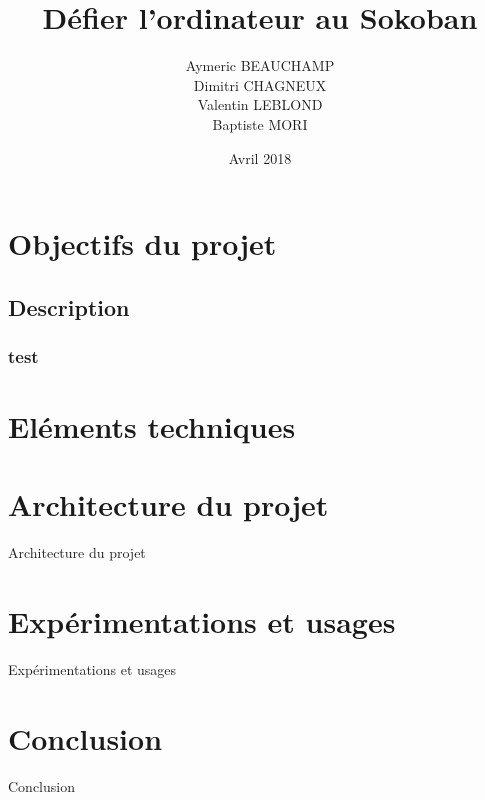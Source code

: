 \documentclass{beamer}
\title{Défier l'ordinateur au Sokoban}
\author{Aymeric BEAUCHAMP\\Dimitri CHAGNEUX\\Valentin LEBLOND\\Baptiste MORI}
\date{Avril 2018}
\begin{document}
 
\maketitle 

\frame{\tableofcontents}

\section{Objectifs du projet}
\subsection{Description}
\begin{frame} %
\frametitle{test}
\end{frame}

\section{Eléments techniques}

\begin{frame}

\end{frame}

\begin{frame}

\end{frame}

\section{Architecture du projet}
\begin{frame}
Architecture du projet
\end{frame}
\section{Expérimentations et usages}
\begin{frame}
Expérimentations et usages
\end{frame}
\section{Conclusion}
\begin{frame}
Conclusion
\end{frame}
\end{document}
